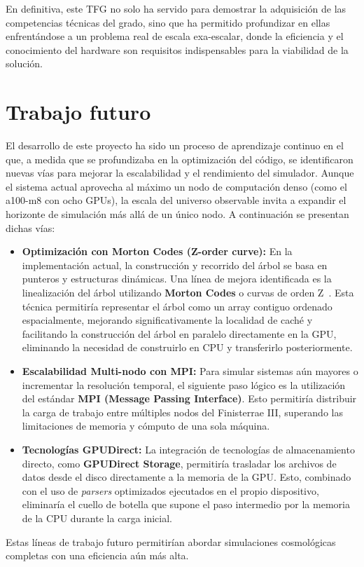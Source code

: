 En definitiva, este TFG no solo ha servido para demostrar la adquisición de las competencias técnicas del grado, sino que ha permitido profundizar en ellas enfrentándose a un problema real de escala exa-escalar, donde la eficiencia y el conocimiento del hardware son requisitos indispensables para la viabilidad de la solución.

\section{Trabajo futuro}\label{sec:trabajo-futuro}
El desarrollo de este proyecto ha sido un proceso de aprendizaje continuo en el que, a medida que se profundizaba en la optimización del código, se identificaron nuevas vías para mejorar la escalabilidad y el rendimiento del simulador.
Aunque el sistema actual aprovecha al máximo un nodo de computación denso (como el a100-m8 con ocho GPUs), la escala del universo observable invita a expandir el horizonte de simulación más allá de un único nodo.
A continuación se presentan dichas vías:
\begin{itemize}
    \item \textbf{Optimización con Morton Codes (Z-order curve):}
    En la implementación actual, la construcción y recorrido del árbol se basa en punteros y estructuras dinámicas.
    Una línea de mejora identificada es la linealización del árbol utilizando \textbf{Morton Codes} o curvas de orden Z~\cite{morton1966}.
    Esta técnica permitiría representar el árbol como un array contiguo ordenado espacialmente, mejorando significativamente la localidad de caché y facilitando la construcción del árbol en paralelo directamente en la GPU, eliminando la necesidad de construirlo en CPU y transferirlo posteriormente.
    \item \textbf{Escalabilidad Multi-nodo con MPI:}
    Para simular sistemas aún mayores o incrementar la resolución temporal, el siguiente paso lógico es la utilización del estándar \textbf{MPI (Message Passing Interface)}.
    Esto permitiría distribuir la carga de trabajo entre múltiples nodos del Finisterrae III, superando las limitaciones de memoria y cómputo de una sola máquina.
    \item \textbf{Tecnologías GPUDirect:}
    La integración de tecnologías de almacenamiento directo, como \textbf{GPUDirect Storage}, permitiría trasladar los archivos de datos desde el disco directamente a la memoria de la GPU. Esto, combinado con el uso de \textit{parsers} optimizados ejecutados en el propio dispositivo, eliminaría el cuello de botella que supone el paso intermedio por la memoria de la CPU durante la carga inicial.

\end{itemize}

Estas líneas de trabajo futuro permitirían abordar simulaciones cosmológicas completas con una eficiencia aún más alta.



